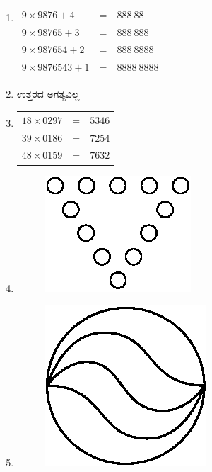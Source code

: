 \begin{enumerate}
\item 
\begin{tabular}[t]{lll}
$9\times 9876 + 4$ & = & $888~88$\\
$9\times 98765 + 3$ & = & $888~888$\\
$9\times 987654 + 2$ & = & $888~8888$\\
$9\times 9876543 + 1$ & = & $8888~8888$\\
\end{tabular}

\item ಉತ್ತರದ ಅಗತ್ಯವಿಲ್ಲ 

\item 
\begin{tabular}[t]{lll}
$18\times 0297$ & = & $5346$\\
$39\times 0186$ & = & $7254$\\
$48\times 0159$ & = & $7632$
\end{tabular}

\item 
\begin{figure}[H]
\centering
\includegraphics{images/chap10/ans17.eps}
\end{figure}

\item 
\begin{figure}[H]
\centering
\includegraphics{images/chap10/ans18.eps}
\end{figure}


\end{enumerate}
